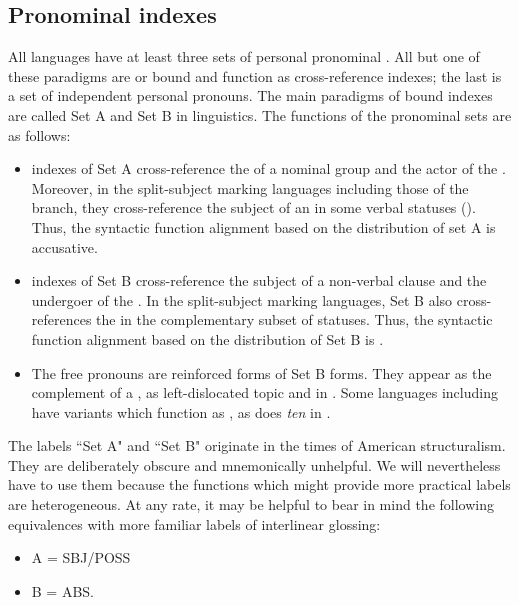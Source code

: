 \documentclass[output=paper]{langsci/langscibook}
\begin{document}
\subsection{Pronominal indexes}\label{sec:lehmann:4.1}

All  languages have at least three sets of personal pronominal . All but one of these paradigms are  or bound and function as cross-reference indexes; the last is a set of independent personal pronouns. The main paradigms of bound indexes are called Set A and Set B in  linguistics. The functions of the pronominal sets are as follows:


\begin{itemize}
\item 
indexes of Set A cross-reference the  of a nominal group and the actor of the . Moreover, in the split-subject marking languages including those of the  branch, they cross-reference the subject of an  in some verbal statuses (). Thus, the syntactic function alignment based on the distribution of set A  is accusative.
\item 
indexes of Set B cross-reference the subject of a non-verbal clause and the undergoer of the . In the split-subject marking languages, Set B also cross-references the   in the complementary subset of statuses. Thus, the syntactic function alignment based on the distribution of Set B is .

\item 
The free pronouns are reinforced forms of Set B forms. They appear as the complement of a , as left-dislocated topic and in . Some languages including   have  variants which function as , as does \textit{ten} in .
\end{itemize}

The labels “Set A" and “Set B" originate in the times of American structuralism. They are deliberately obscure and mnemonically unhelpful. We will nevertheless have to use them because the functions which might provide more practical labels are heterogeneous. At any rate, it may be helpful to bear in mind the following equivalences with more familiar labels of interlinear glossing:


\begin{itemize}
\item 
A = SBJ/POSS
\item 
B = ABS.
\end{itemize}
\end{document}
